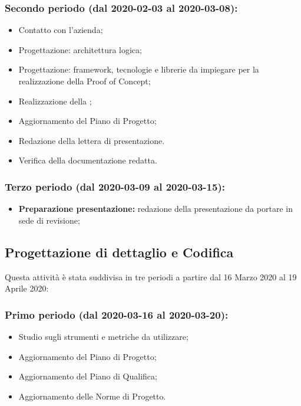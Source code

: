 		\subsubsection{Secondo periodo (dal 2020-02-03 al 2020-03-08):}
			\begin{itemize}
				\item Contatto con l'azienda;
				\item Progettazione: architettura logica;
				\item Progettazione: framework, tecnologie e librerie da impiegare per la realizzazione della Proof of Concept;
				\item Realizzazione della ;
				\item Aggiornamento del Piano di Progetto;
				\item Redazione della lettera di presentazione.
				\item Verifica della documentazione redatta.
			\end{itemize}

		\subsubsection{Terzo periodo (dal 2020-03-09 al 2020-03-15):}
			\begin{itemize}
				\item \textbf{Preparazione presentazione:} redazione della presentazione da portare in sede di revisione;
			\end{itemize}

	\subsection{Progettazione di dettaglio e Codifica}
	Questa attività è stata suddivisa in tre periodi a partire dal 16 Marzo 2020 al 19 Aprile 2020:


		\subsubsection{Primo periodo (dal 2020-03-16 al 2020-03-20):}
			\begin{itemize}
				\item Studio sugli strumenti e metriche da utilizzare;
			 	\item Aggiornamento del Piano di Progetto;
			 	\item Aggiornamento del Piano di Qualifica;
			 	\item Aggiornamento delle Norme di Progetto.
			\end{itemize} 	
		
